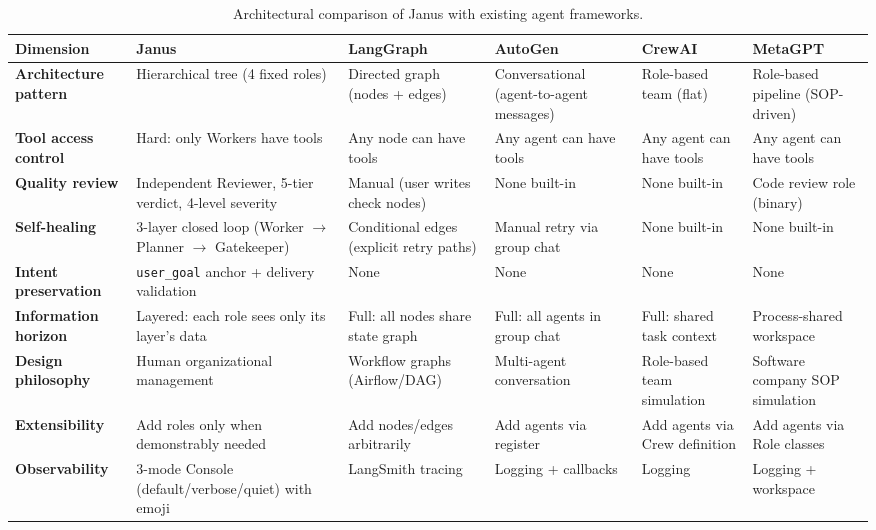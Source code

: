 \documentclass[11pt,a4paper]{article}
\begin{document}
\begin{table}[H]
\centering
\caption{Architectural comparison of Janus with existing agent frameworks.}
\label{tab:comparison}
\small
\begin{tabular}{p{2.3cm}p{2.3cm}p{2.3cm}p{2.3cm}p{2.3cm}p{2.3cm}}
\toprule
\textbf{Dimension} & \textbf{Janus} & \textbf{LangGraph} & \textbf{AutoGen} & \textbf{CrewAI} & \textbf{MetaGPT} \\
\midrule
\textbf{Architecture pattern}
    & Hierarchical tree (4 fixed roles)
    & Directed graph (nodes + edges)
    & Conversational (agent-to-agent messages)
    & Role-based team (flat)
    & Role-based pipeline (SOP-driven) \\
\midrule
\textbf{Tool access control}
    & Hard: only Workers have tools
    & Any node can have tools
    & Any agent can have tools
    & Any agent can have tools
    & Any agent can have tools \\
\midrule
\textbf{Quality review}
    & Independent Reviewer, 5-tier verdict, 4-level severity
    & Manual (user writes check nodes)
    & None built-in
    & None built-in
    & Code review role (binary) \\
\midrule
\textbf{Self-healing}
    & 3-layer closed loop (Worker $\rightarrow$ Planner $\rightarrow$ Gatekeeper)
    & Conditional edges (explicit retry paths)
    & Manual retry via group chat
    & None built-in
    & None built-in \\
\midrule
\textbf{Intent preservation}
    & \texttt{user\_goal} anchor + delivery validation
    & None
    & None
    & None
    & None \\
\midrule
\textbf{Information horizon}
    & Layered: each role sees only its layer's data
    & Full: all nodes share state graph
    & Full: all agents in group chat
    & Full: shared task context
    & Process-shared workspace \\
\midrule
\textbf{Design philosophy}
    & Human organizational management
    & Workflow graphs (Airflow/DAG)
    & Multi-agent conversation
    & Role-based team simulation
    & Software company SOP simulation \\
\midrule
\textbf{Extensibility}
    & Add roles only when demonstrably needed
    & Add nodes/edges arbitrarily
    & Add agents via register
    & Add agents via Crew definition
    & Add agents via Role classes \\
\midrule
\textbf{Observability}
    & 3-mode Console (default/verbose/quiet) with emoji
    & LangSmith tracing
    & Logging + callbacks
    & Logging
    & Logging + workspace \\
\bottomrule
\end{tabular}
\end{table}
\end{document}
